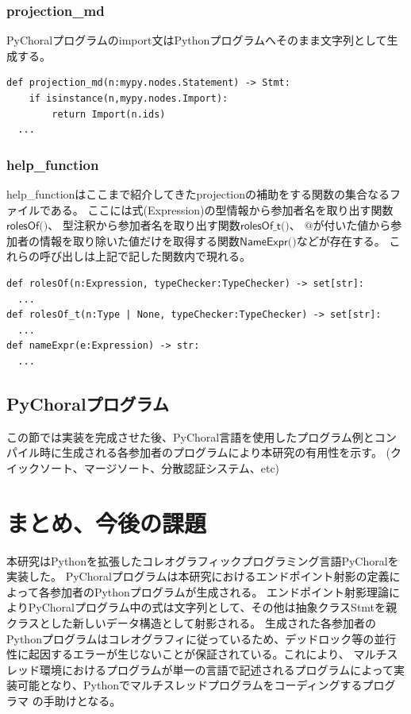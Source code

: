 \documentclass{thesis}
\begin{document}
\subsection{projection\_md}
PyChoralプログラムのimport文はPythonプログラムへそのまま文字列として生成する。
\begin{lstlisting}[caption=pro\_md.py]
def projection_md(n:mypy.nodes.Statement) -> Stmt:
    if isinstance(n,mypy.nodes.Import):
        return Import(n.ids)
  ... 
\end{lstlisting}
\subsection{help\_function}
help\_functionはここまで紹介してきたprojectionの補助をする関数の集合なるファイルである。
ここには式(\textsf{Expression})の型情報から参加者名を取り出す関数$\textsf{rolesOf()}$、
型注釈から参加者名を取り出す関数$\textsf{rolesOf\_t()}$、
$@$が付いた値から参加者の情報を取り除いた値だけを取得する関数$\textsf{NameExpr()}$などが存在する。
これらの呼び出しは上記で記した関数内で現れる。
\begin{lstlisting}[caption=help\_func.py]
def rolesOf(n:Expression, typeChecker:TypeChecker) -> set[str]:
  ... 
def rolesOf_t(n:Type | None, typeChecker:TypeChecker) -> set[str]:
  ... 
def nameExpr(e:Expression) -> str:
  ... 
\end{lstlisting}
\section{PyChoralプログラム}
この節では実装を完成させた後、PyChoral言語を使用したプログラム例とコンパイル時に生成される各参加者のプログラムにより本研究の有用性を示す。
(クイックソート、マージソート、分散認証システム、etc)

\chapter{まとめ、今後の課題}
本研究はPythonを拡張したコレオグラフィックプログラミング言語PyChoralを実装した。
PyChoralプログラムは本研究におけるエンドポイント射影の定義によって各参加者のPythonプログラムが生成される。
エンドポイント射影理論によりPyChoralプログラム中の式は文字列として、その他は抽象クラス\textsf{Stmt}を親クラスとした新しいデータ構造として射影される。
生成された各参加者のPythonプログラムはコレオグラフィに従っているため、デッドロック等の並行性に起因するエラーが生じないことが保証されている。これにより、
マルチスレッド環境におけるプログラムが単一の言語で記述されるプログラムによって実装可能となり、Pythonでマルチスレッドプログラムをコーディングするプログラマ
の手助けとなる。
\end{document}
